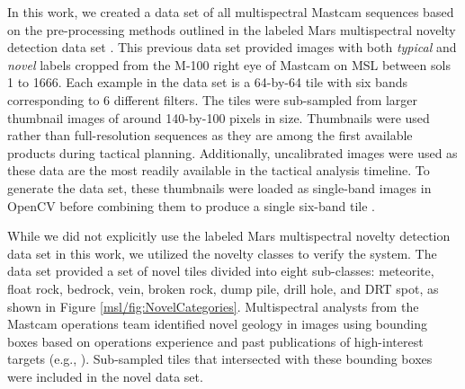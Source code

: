 In this work, we created a data set of all multispectral Mastcam sequences based on the pre-processing methods outlined in the labeled Mars multispectral novelty detection data set \parencite{kerner_data}.
This previous data set provided images with both \textit{typical} and \textit{novel} labels cropped from the M-100 right eye of Mastcam on MSL between sols 1 to 1666.
Each example in the data set is a 64-by-64 tile with six bands corresponding to 6 different filters.
The tiles were sub-sampled from larger thumbnail images of around 140-by-100 pixels in size. 
Thumbnails were used rather than full-resolution sequences as they are among the first available products during tactical planning. 
Additionally, uncalibrated images were used as these data are the most readily available in the tactical analysis timeline. 
To generate the data set, these thumbnails were loaded as single-band images in OpenCV before combining them to produce a single six-band tile \parencite{opencv_library}.

While we did not explicitly use the labeled Mars multispectral novelty detection data set in this work, we utilized the novelty classes to verify the system.
The data set provided a set of novel tiles divided into eight sub-classes: meteorite, float rock, bedrock, vein, broken rock, dump pile, drill hole, and DRT spot, as shown in Figure \ref{msl/fig:NovelCategories}. 
Multispectral analysts from the Mastcam operations team identified novel geology in images using bounding boxes based on operations experience and past publications of high-interest targets (e.g., \cite{wellington2017visible}).
Sub-sampled tiles that intersected with these bounding boxes were included in the novel data set.


